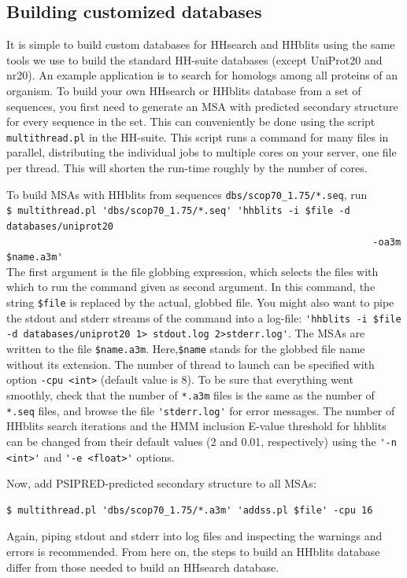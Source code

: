 \documentclass[11pt,a4paper]{article}
\begin{document}
\subsection{Building customized databases}

It is simple to build custom databases for HHsearch and HHblits using the same tools we use to build the standard HH-suite databases (except UniProt20 and nr20). An example application is to search for homologs among all proteins of an organism. To build your own HHsearch or HHblits database from a set of sequences, you first need to generate an MSA with predicted secondary structure for every sequence in the set. This can conveniently be done using the script \verb`multithread.pl` in the HH-suite. This script runs a command for many files in parallel, distributing the individual jobs to multiple cores on your server, one file per thread. This will shorten the run-time roughly by the number of cores. 

To build MSAs with HHblits from sequences \verb`dbs/scop70_1.75/*.seq`, run\\[-1mm]

\verb`$ multithread.pl 'dbs/scop70_1.75/*.seq' 'hhblits -i $file -d databases/uniprot20`\\
\verb`                                                                 -oa3m $name.a3m'`\\[-1mm]

The first argument is the file globbing expression, which selects the files with which to run the command given as second argument. In this command, the string \verb`$file` is replaced by the actual, globbed file. You might also want to pipe the stdout and stderr streams of the command into a log-file: \verb`'hhblits -i $file -d databases/uniprot20 1> stdout.log 2>stderr.log'`. The MSAs are written to the file \verb`$name.a3m`. Here,\verb`$name` stands for the globbed file name without its extension. The number of thread to launch can be specified with option \verb`-cpu <int>` (default value is 8). To be sure that everything went smoothly, check that the number of \verb`*.a3m` files is the same as the number of \verb`*.seq` files, and browse the file \verb`'stderr.log'` for error messages. The number of HHblits search iterations and the HMM inclusion E-value threshold for hhblits can be changed from their default values (2 and 0.01, respectively) using the \verb`'-n <int>'` and \verb`'-e <float>'` options. 

Now, add PSIPRED-predicted secondary structure to all MSAs:
\begin{verbatim}
$ multithread.pl 'dbs/scop70_1.75/*.a3m' 'addss.pl $file' -cpu 16 
\end{verbatim}
Again, piping stdout and stderr into log files and inspecting the warnings and errors is recommended. From here on, the steps to build an HHblits database differ from those needed to build an HHsearch database.
\end{document}

